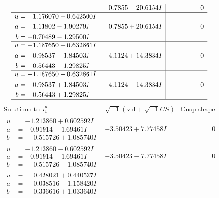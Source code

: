 \documentclass[1p]{elsarticle_modified}
\theoremstyle{definition}
\newcommand{\I}{\sqrt{-1}}
\begin{document}
$$\begin{array}{c|c|c}
 & \phantom{-}0.7855 - 20.6154 I & \phantom{-0.000000 } 0 \\ \hline\begin{aligned}
u &= \phantom{-}1.176070 - 0.642500 I \\
a &= \phantom{-}1.11802 - 1.90279 I \\
b &= -0.70489 - 1.29500 I\end{aligned}
 & \phantom{-}0.7855 + 20.6154 I & \phantom{-0.000000 } 0 \\ \hline\begin{aligned}
u &= -1.187650 + 0.632861 I \\
a &= \phantom{-}0.98537 - 1.84503 I \\
b &= -0.56443 - 1.29825 I\end{aligned}
 & -4.1124 + 14.3834 I & \phantom{-0.000000 } 0 \\ \hline\begin{aligned}
u &= -1.187650 - 0.632861 I \\
a &= \phantom{-}0.98537 + 1.84503 I \\
b &= -0.56443 + 1.29825 I\end{aligned}
 & -4.1124 - 14.3834 I & \phantom{-0.000000 } 0\\
 \hline 
 \end{array}$$\newpage$$\begin{array}{c|c|c}  
\text{Solutions to }I^u_{1}& \I (\text{vol} + \sqrt{-1}CS) & \text{Cusp shape}\\
 \hline 
\begin{aligned}
u &= -1.213860 + 0.602592 I \\
a &= -0.91914 + 1.69461 I \\
b &= \phantom{-}0.515726 + 1.085740 I\end{aligned}
 & -3.50423 + 7.77458 I & \phantom{-0.000000 } 0 \\ \hline\begin{aligned}
u &= -1.213860 - 0.602592 I \\
a &= -0.91914 - 1.69461 I \\
b &= \phantom{-}0.515726 - 1.085740 I\end{aligned}
 & -3.50423 - 7.77458 I & \phantom{-0.000000 } 0 \\ \hline\begin{aligned}
u &= \phantom{-}0.428021 + 0.440537 I \\
a &= \phantom{-}0.038516 - 1.158420 I \\
b &= \phantom{-}0.336616 + 1.033640 I\end{aligned}

\end{array}$$
\end{document}
